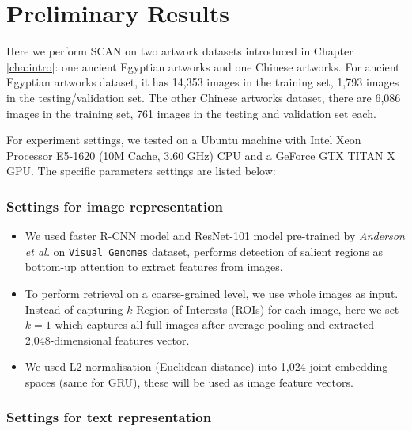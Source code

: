 
\section{Preliminary Results}
Here we perform SCAN on two artwork datasets introduced in Chapter \ref{cha:intro}: one ancient Egyptian artworks and one Chinese artworks. For ancient Egyptian artworks dataset, it has 14,353 images in the training set, 1,793 images in the testing/validation set. The other Chinese artworks dataset, there are 6,086 images in the training set, 761 images in the testing and validation set each.

For experiment settings, we tested on a Ubuntu machine with Intel Xeon Processor E5-1620 (10M Cache, 3.60 GHz) CPU and a GeForce GTX TITAN X GPU. The specific parameters settings are listed below:

\subsubsection{Settings for image representation}

\begin{itemize}
    \item We used faster R-CNN model and ResNet-101 model pre-trained by \textit{Anderson et al.} on \verb|Visual Genomes| dataset, performs detection of salient regions as bottom-up attention to extract features from images. 
    \item To perform retrieval on a coarse-grained level, we use whole images as input. Instead of capturing $k$ Region of Interests (ROIs) for each image, here we set $k=1$ which captures all full images after average pooling and extracted 2,048-dimensional features vector.
    \item We used L2 normalisation (Euclidean distance) into 1,024 joint embedding spaces (same for GRU), these will be used as image feature vectors.
\end{itemize}

\subsubsection{Settings for text representation}

